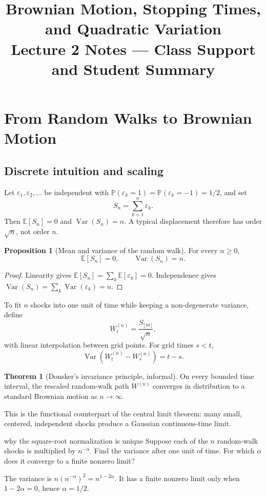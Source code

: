 \documentclass[10pt]{article}
\title{\textbf{Brownian Motion, Stopping Times, and Quadratic Variation}\\
\large Lecture 2 Notes --- Class Support and Student Summary}
\author{}
\date{}
\newcommand{\E}{\mathbb E}
\newcommand{\Pbb}{\mathbb P}
\newcommand{\Var}{\operatorname{Var}}
\newcommand{\1}{\mathbf 1}
\theoremstyle{definition}
\newtheorem{proposition}[definition]{Proposition}
\newtheorem{theorem}[definition]{Theorem}
\begin{document}
\maketitle
\vspace{-1.4em}

\section{From Random Walks to Brownian Motion}

\subsection{Discrete intuition and scaling}

Let \(\varepsilon_1,\varepsilon_2,\ldots\) be independent with
\(\Pbb(\varepsilon_k=1)=\Pbb(\varepsilon_k=-1)=1/2\), and set
\[
S_n=\sum_{k=1}^n\varepsilon_k.
\]
Then \(\E[S_n]=0\) and \(\Var(S_n)=n\). A typical displacement therefore
has order \(\sqrt n\), not order \(n\).

\begin{proposition}[Mean and variance of the random walk]
For every \(n\geq0\),
\[
\E[S_n]=0,
\qquad
\Var(S_n)=n.
\]
\end{proposition}

\begin{proof}
Linearity gives \(\E[S_n]=\sum_k\E[\varepsilon_k]=0\). Independence gives
\(\Var(S_n)=\sum_k\Var(\varepsilon_k)=n\).
\end{proof}

To fit \(n\) shocks into one unit of time while keeping a non-degenerate
variance, define
\[
W_t^{(n)}=\frac{S_{\lfloor nt\rfloor}}{\sqrt n},
\]
with linear interpolation between grid points. For grid times \(s<t\),
\[
\Var(W_t^{(n)}-W_s^{(n)})=t-s.
\]

\begin{theorem}[Donsker's invariance principle, informal]
On every bounded time interval, the rescaled random-walk path \(W^{(n)}\)
converges in distribution to a standard Brownian motion as \(n\to\infty\).
\end{theorem}

This is the functional counterpart of the central limit theorem: many small,
centered, independent shocks produce a Gaussian continuous-time limit.

\begin{studentexercise}{why the square-root normalization is unique}
Suppose each of the \(n\) random-walk shocks is multiplied by \(n^{-\alpha}\).
Find the variance after one unit of time. For which \(\alpha\) does it converge
to a finite nonzero limit?
\end{studentexercise}
\begin{shortsolution}
The variance is \(n(n^{-\alpha})^2=n^{1-2\alpha}\). It has a finite nonzero
limit only when \(1-2\alpha=0\), hence \(\alpha=1/2\).
\end{shortsolution}
\end{document}
